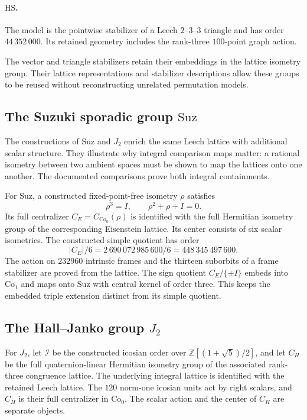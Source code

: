 \documentclass[11pt]{article}
\numberwithin{equation}{section}
\theoremstyle{definition}
\newcommand{\Z}{\mathbb Z}
\newcommand{\Co}{\mathrm{Co}}
\newcommand{\Suz}{\mathrm{Suz}}
\begin{document}
\paragraph{\texorpdfstring{$\mathrm{HS}$}{HS}.}
The model is the pointwise stabilizer of a Leech $2$--$3$--$3$
triangle and has order $44\,352\,000$. Its retained geometry
includes the rank-three $100$-point graph action.

The vector and triangle stabilizers retain their embeddings in the
lattice isometry group. Their lattice representations and stabilizer
descriptions allow these groups to be reused without reconstructing
unrelated permutation models.

\subsection{The Suzuki sporadic group \texorpdfstring{$\Suz$}{Suz}}

The constructions of $\Suz$ and $J_2$ enrich the same Leech lattice with
additional scalar structure. They illustrate why integral comparison
maps matter: a rational isometry between two ambient spaces must be
shown to map the lattices onto one another. The documented
comparisons prove both integral containments.

For $\Suz$, a constructed fixed-point-free isometry $\rho$ satisfies
\[
 \rho^3=I,\qquad \rho^2+\rho+I=0.
\]
Its full centralizer $C_E=C_{\Co_0}(\rho)$ is identified with the full
Hermitian isometry group of the corresponding Eisenstein lattice.
Its center consists of six scalar isometries. The constructed simple
quotient has order
\[
 |C_E|/6=2\,690\,072\,985\,600/6=448\,345\,497\,600.
\]
The action on $232960$ intrinsic frames and the thirteen suborbits of
a frame stabilizer are proved from the lattice. The sign quotient
$C_E/\{\pm I\}$ embeds into $\Co_1$ and maps onto $\Suz$ with central
kernel of order three. This keeps the embedded triple extension
distinct from its simple quotient.

\subsection{The Hall--Janko group \texorpdfstring{$J_2$}{J2}}

For $J_2$, let $\mathcal I$ be the constructed icosian order over
$\Z[(1+\sqrt5)/2]$, and let $C_H$ be the full quaternion-linear
Hermitian isometry group of the associated rank-three congruence
lattice. The underlying integral lattice is identified with the
retained Leech lattice. The $120$ norm-one icosian units act by right
scalars, and $C_H$ is their full centralizer in $\Co_0$.
The scalar action and the center of $C_H$ are separate objects.
\end{document}
